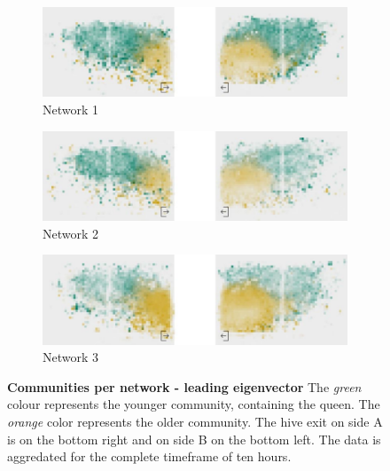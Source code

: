 \begin{figure}[htb]
	\centering
	\begin{subfigure}[b]{1.0\textwidth}
		\centering
		\includegraphics[width=\textwidth]{Figures/le_network1}
		\caption[Network 1]{Network 1}
		\label{fig:le1}
		\vspace*{5mm}
	\end{subfigure}
	\begin{subfigure}[b]{1.0\textwidth}
		\includegraphics[width=\textwidth]{Figures/le_network2}
		\caption[Network 2]{Network 2}
		\label{fig:le2}
		\vspace*{5mm}
	\end{subfigure}
	\begin{subfigure}[b]{1.0\textwidth}
		\includegraphics[width=\textwidth]{Figures/le_network3}
		\caption[Network 3]{Network 3}
		\label{fig:le3}
		\vspace*{5mm}
	\end{subfigure}
	\caption[Communities per network - leading eigenvector]{\textbf{Communities per network - leading eigenvector} The \emph{green} colour represents the younger community, containing the queen. The \emph{orange} color represents the older community. The hive exit on side A is on the bottom right and on side B on the bottom left. The data is aggredated for the complete timeframe of ten hours.}
	\label{fig:communitiesPerNetworkLE}
\end{figure}


